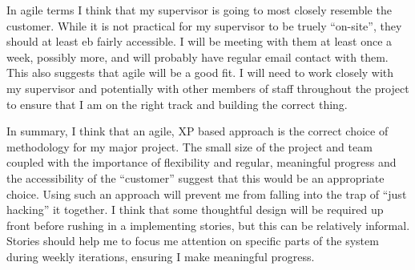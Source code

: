 \documentclass[paper=a4, fontsize=11pt]{scrartcl}	%
\numberwithin{equation}{section} %
\numberwithin{figure}{section} %
\numberwithin{table}{section}
\begin{document}
In agile terms I think that my supervisor is going to most closely resemble the customer. While it is not practical for my supervisor to be truely ``on-site'', they should at least eb fairly accessible. I will be meeting with them at least once a week, possibly more, and will probably have regular email contact with them. This also suggests that agile will be a good fit. I will need to work closely with my supervisor and potentially with other members of staff throughout the project to ensure that I am on the right track and building the correct thing.

In summary, I think that an agile, XP based approach is the correct choice of methodology for my major project. The small size of the project and team coupled with the importance of flexibility and regular, meaningful progress and the accessibility of the ``customer'' suggest that this would be an appropriate choice. Using such an approach will prevent me from falling into the trap of ``just hacking'' it together. I think that some thoughtful design will be required up front before rushing in a implementing stories, but this can be relatively informal. Stories should help me to focus me attention on specific parts of the system during weekly iterations, ensuring I make meaningful progress.

\clearpage


\end{document}
